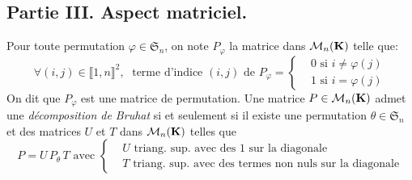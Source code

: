\subsection*{Partie III. Aspect matriciel.}
Pour toute permutation $\varphi \in \mathfrak{S}_n$, on note $P_\varphi$ la matrice dans $\mathcal{M}_n(\mathbf{K})$ telle que:
\begin{displaymath}
  \forall (i,j)\in \llbracket 1,n \rrbracket^2,\; \text{ terme d'indice $(i,j)$ de } P_\varphi =
\left\lbrace 
\begin{aligned}
  &0 \text{ si } i \neq \varphi(j) \\ &1 \text{ si } i = \varphi(j)  
\end{aligned}
\right. 
\end{displaymath}
On dit que $P_\varphi$ est une matrice de permutation. \newline
Une matrice $P\in \mathcal{M}_n(\mathbf{K})$ admet une \emph{décomposition de Bruhat} si et seulement si il existe une permutation $\theta \in \mathfrak{S}_n$ et des matrices $U$ et $T$ dans $\mathcal{M}_n(\mathbf{K})$ telles que
\begin{displaymath}
  P = U\,P_\theta\,T \text{ avec }
  \left\lbrace 
  \begin{aligned}
    &U \text{ triang. sup. avec des 1 sur la diagonale} \\
    &T \text{ triang. sup. avec des termes non nuls sur la diagonale} 
  \end{aligned}
  \right. 
\end{displaymath}
